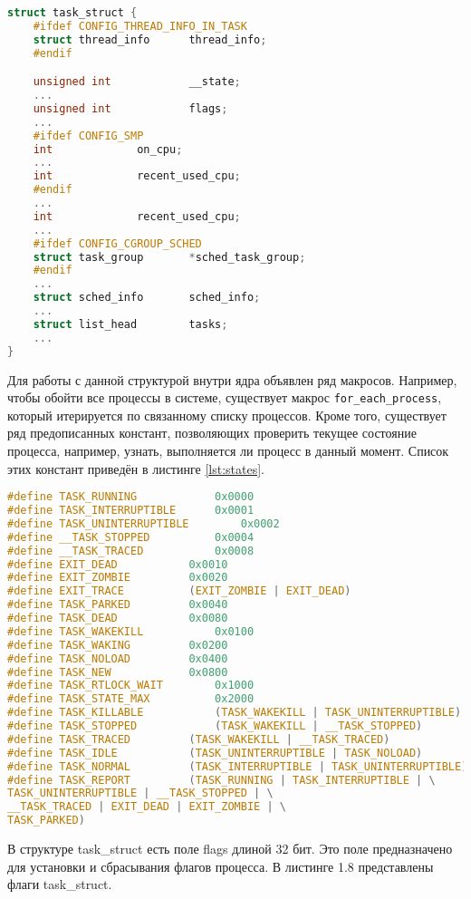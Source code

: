 \begin{lstlisting}[label=lst:task-struct, caption=Листинг структуры task\_struct с наиболее важными полями, language=c]
struct task_struct {
	#ifdef CONFIG_THREAD_INFO_IN_TASK
	struct thread_info		thread_info;
	#endif

	unsigned int			__state;
	...
	unsigned int			flags;
	...
	#ifdef CONFIG_SMP
	int				on_cpu;
	...
	int				recent_used_cpu;
	#endif
	...
	int				recent_used_cpu;
	...
	#ifdef CONFIG_CGROUP_SCHED
	struct task_group		*sched_task_group;
	#endif
	...
	struct sched_info		sched_info;
	...
	struct list_head		tasks;
	...
}
\end{lstlisting}

Для работы с данной структурой внутри ядра объявлен ряд макросов. Например, чтобы обойти все процессы в системе, существует макрос \texttt{for\_each\_process}, который итерируется по связанному списку процессов. Кроме того, существует ряд предописанных констант, позволяющих проверить текущее состояние процесса, например, узнать, выполняется ли процесс в данный момент. Список этих констант приведён в листинге \ref{lst:states}.\\

\begin{lstlisting}[label=lst:states, caption=Описание состояний процесса с помощью предописанных констант, language=c]
#define TASK_RUNNING			0x0000
#define TASK_INTERRUPTIBLE		0x0001
#define TASK_UNINTERRUPTIBLE		0x0002
#define __TASK_STOPPED			0x0004
#define __TASK_TRACED			0x0008
#define EXIT_DEAD			0x0010
#define EXIT_ZOMBIE			0x0020
#define EXIT_TRACE			(EXIT_ZOMBIE | EXIT_DEAD)
#define TASK_PARKED			0x0040
#define TASK_DEAD			0x0080
#define TASK_WAKEKILL			0x0100
#define TASK_WAKING			0x0200
#define TASK_NOLOAD			0x0400
#define TASK_NEW			0x0800
#define TASK_RTLOCK_WAIT		0x1000
#define TASK_STATE_MAX			0x2000
#define TASK_KILLABLE			(TASK_WAKEKILL | TASK_UNINTERRUPTIBLE)
#define TASK_STOPPED			(TASK_WAKEKILL | __TASK_STOPPED)
#define TASK_TRACED			(TASK_WAKEKILL | __TASK_TRACED)
#define TASK_IDLE			(TASK_UNINTERRUPTIBLE | TASK_NOLOAD)
#define TASK_NORMAL			(TASK_INTERRUPTIBLE | TASK_UNINTERRUPTIBLE)
#define TASK_REPORT			(TASK_RUNNING | TASK_INTERRUPTIBLE | \
TASK_UNINTERRUPTIBLE | __TASK_STOPPED | \
__TASK_TRACED | EXIT_DEAD | EXIT_ZOMBIE | \
TASK_PARKED)
\end{lstlisting}

В структуре task\_struct есть поле flags длиной 32 бит. Это поле предназначено для установки и сбрасывания флагов процесса. В листинге 1.8 представлены флаги task\_struct.

